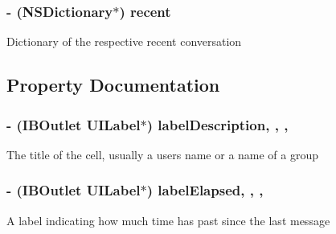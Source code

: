 \subsubsection[{recent}]{\setlength{\rightskip}{0pt plus 5cm}-\/ (N\+S\+Dictionary$\ast$) recent\hspace{0.3cm}{\ttfamily [protected]}}\label{category_e_s_recent_cell_07_08_af25d1eada427c8d49c7f0a00a1ec78f2}
Dictionary of the respective recent conversation 

\subsection{Property Documentation}
\hypertarget{category_e_s_recent_cell_07_08_a6936efe55d01cb7eedba8eb650ef9d78}{}
\subsubsection[{label\+Description}]{\setlength{\rightskip}{0pt plus 5cm}-\/ (I\+B\+Outlet U\+I\+Label$\ast$) label\+Description\hspace{0.3cm}{\ttfamily [read]}, {\ttfamily [write]}, {\ttfamily [nonatomic]}, {\ttfamily [strong]}}\label{category_e_s_recent_cell_07_08_a6936efe55d01cb7eedba8eb650ef9d78}
The title of the cell, usually a user\textquotesingle{}s name or a name of a group \hypertarget{category_e_s_recent_cell_07_08_abb8e3fcc95b70fa597388a4abfb5e8fc}{}
\subsubsection[{label\+Elapsed}]{\setlength{\rightskip}{0pt plus 5cm}-\/ (I\+B\+Outlet U\+I\+Label$\ast$) label\+Elapsed\hspace{0.3cm}{\ttfamily [read]}, {\ttfamily [write]}, {\ttfamily [nonatomic]}, {\ttfamily [strong]}}\label{category_e_s_recent_cell_07_08_abb8e3fcc95b70fa597388a4abfb5e8fc}
A label indicating how much time has past since the last message \hypertarget{category_e_s_recent_cell_07_08_a88a3b6916e4e963618de5cc159ffc675}{}

